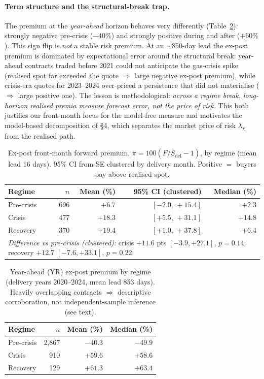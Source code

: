 \documentclass[11pt,a4paper]{article}
\begin{document}
\paragraph{Term structure and the structural-break trap.} The premium at the
\emph{year-ahead} horizon behaves very differently (Table~\ref{tab:yr}): strongly
negative pre-crisis ($-40\%$) and strongly positive during and after ($+60\%$).
This sign flip is \emph{not} a stable risk premium. At an $\sim$850-day lead the
ex-post premium is dominated by expectational error around the structural break:
year-ahead contracts traded before 2021 could not anticipate the gas-crisis spike
(realised spot far exceeded the quote $\Rightarrow$ large negative ex-post
premium), while crisis-era quotes for 2023--2024 over-priced a persistence that did
not materialise ($\Rightarrow$ large positive one). The lesson is methodological:
\emph{across a regime break, long-horizon realised premia measure forecast error,
not the price of risk.} This both justifies our front-month focus for the
model-free measure and motivates the model-based decomposition of \S4, which
separates the market price of risk $\lambda_\chi$ from the realised path.

\begin{table}[t]
\centering\small
\caption{Ex-post front-month forward premium, $\pi=100(F/\bar S_{\text{del}}-1)$,
by regime (mean lead 16 days). 95\% CI from SE clustered by delivery month.
Positive $=$ buyers pay above realised spot.}
\label{tab:prem}
\begin{tabular}{lrrrr}
\toprule
Regime & $n$ & Mean (\%) & 95\% CI (clustered) & Median (\%) \\
\midrule
Pre-crisis & 696 & $+6.7$  & $[-2.0,\,+15.4]$ & $+2.3$ \\
Crisis     & 477 & $+18.3$ & $[+5.5,\,+31.1]$ & $+14.8$ \\
Recovery   & 370 & $+19.4$ & $[+1.0,\,+37.8]$ & $+6.4$ \\
\midrule
\multicolumn{5}{l}{\emph{Difference vs pre-crisis (clustered):} crisis $+11.6$ pts
$[-3.9,+27.1]$, $p=0.14$; recovery $+12.7$ $[-7.6,+33.1]$, $p=0.22$.}\\
\bottomrule
\end{tabular}
\end{table}

\begin{table}[t]
\centering\small
\caption{Year-ahead (YR) ex-post premium by regime (delivery years 2020--2024,
mean lead 853 days). Heavily overlapping contracts $\Rightarrow$ descriptive
corroboration, not independent-sample inference (see text).}
\label{tab:yr}
\begin{tabular}{lrrr}
\toprule
Regime & $n$ & Mean (\%) & Median (\%) \\
\midrule
Pre-crisis & 2{,}867 & $-40.3$ & $-49.9$ \\
Crisis     &   910 & $+59.6$ & $+58.6$ \\
Recovery   &   129 & $+61.3$ & $+63.4$ \\
\bottomrule
\end{tabular}
\end{table}
\end{document}
